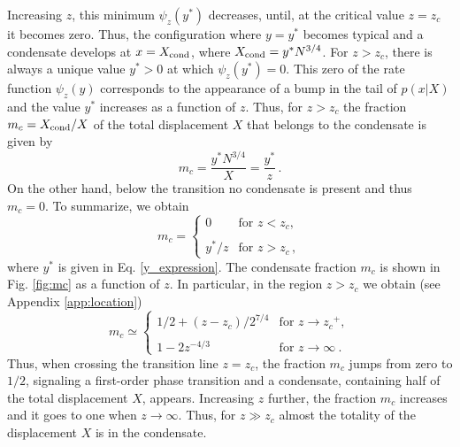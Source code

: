 \documentclass[aps,pre,twocolumn,superscriptaddress,showpacs]{revtex4-1}
\begin{document}
Increasing $z$, this minimum $\psi_z(y^*)$ decreases, until, at the critical value $z=z_c$ it becomes zero. Thus, the configuration where $y=y^*$ becomes typical and a condensate develops at $x=X_{\rm cond}$, where $X_{\rm cond}=y^* N^{3/4}$. For $z>z_c$, there is always a unique value $y^*>0$ at which $\psi_z(y^*)=0$. This zero of the rate function $\psi_z(y)$ corresponds to the appearance of a bump in the tail of $p(x|X)$ and the value $y^*$ increases as a function of $z$. Thus, for $z>z_c$ the fraction $m_c=X_{\rm cond}/X$ of the total displacement $X$ that belongs to the condensate is given by 
\begin{equation}
m_c=\frac{y^*N^{3/4}}{X}=\frac{y^*}{z}\,.
\end{equation}
On the other hand, below the transition no condensate is present and thus $m_c=0$. To summarize, we obtain
\begin{equation}
m_c=\begin{cases}
0 & \text{for } z<z_c,\\
\\
y^*/z & \text{for } z>z_c\,,
\end{cases}
\label{mc_expression}
\end{equation}
where $y^*$ is given in Eq. \eqref{y_expression}. The condensate fraction $m_c$ is shown in Fig. \ref{fig:mc} as a function of $z$. In particular, in the region $z>z_c$ we obtain (see Appendix \ref{app:location})
\begin{equation}
m_c\simeq \begin{cases}
1/2 +(z-z_c)/2^{7/4}& \text{for } z\to {z_c}^+,\\
\\
1-2 z^{-4/3}& \text{for } z\to \infty~.
\end{cases}
\label{mc_limits}
\end{equation}
Thus, when crossing the transition line $z=z_c$, the fraction $m_c$ jumps from zero to $1/2$, signaling a first-order phase transition and a condensate, containing half of the total displacement $X$, appears. Increasing $z$ further, the fraction $m_c$ increases and it goes to one when $z\to\infty$. Thus, for $z\gg z_c$ almost the totality of the displacement $X$ is in the condensate.
\end{document}
